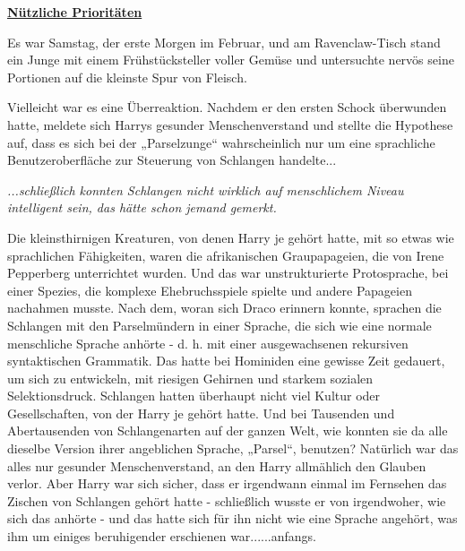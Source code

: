 

\hypertarget{nuxfctzliche-priorituxe4ten}{%

\textbf{\uline{Nützliche Prioritäten}}

\hfill\break Es war Samstag, der erste Morgen im Februar, und am Ravenclaw-Tisch stand ein Junge mit einem Frühstücksteller voller Gemüse und untersuchte nervös seine Portionen auf die kleinste Spur von Fleisch.

Vielleicht war es eine Überreaktion. Nachdem er den ersten Schock überwunden hatte, meldete sich Harrys gesunder Menschenverstand und stellte die Hypothese auf, dass es sich bei der „Parselzunge“ wahrscheinlich nur um eine sprachliche Benutzeroberfläche zur Steuerung von Schlangen handelte...

\emph{...schließlich konnten Schlangen nicht wirklich auf menschlichem Niveau intelligent sein, das hätte schon jemand gemerkt.}

Die kleinsthirnigen Kreaturen, von denen Harry je gehört hatte, mit so etwas wie sprachlichen Fähigkeiten, waren die afrikanischen Graupapageien, die von Irene Pepperberg unterrichtet wurden. Und das war unstrukturierte Protosprache, bei einer Spezies, die komplexe Ehebruchsspiele spielte und andere Papageien nachahmen musste. Nach dem, woran sich Draco erinnern konnte, sprachen die Schlangen mit den Parselmündern in einer Sprache, die sich wie eine normale menschliche Sprache anhörte - d. h. mit einer ausgewachsenen rekursiven syntaktischen Grammatik. Das hatte bei Hominiden eine gewisse Zeit gedauert, um sich zu entwickeln, mit riesigen Gehirnen und starkem sozialen Selektionsdruck. Schlangen hatten überhaupt nicht viel Kultur oder Gesellschaften, von der Harry je gehört hatte. Und bei Tausenden und Abertausenden von Schlangenarten auf der ganzen Welt, wie konnten sie da alle dieselbe Version ihrer angeblichen Sprache, „Parsel“, benutzen? Natürlich war das alles nur gesunder Menschenverstand, an den Harry allmählich den Glauben verlor. Aber Harry war sich sicher, dass er irgendwann einmal im Fernsehen das Zischen von Schlangen gehört hatte - schließlich wusste er von irgendwoher, wie sich das anhörte - und das hatte sich für ihn nicht wie eine Sprache angehört, was ihm um einiges beruhigender erschienen war......anfangs.

}
